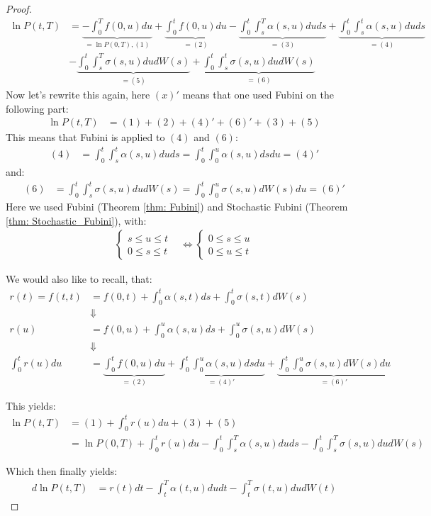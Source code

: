 \begin{proof}
\begin{align*}
\ln P(t,T) &=  
\underbrace{-\int_{0}^{T}f(0,u)du}_{= \ln P(0,T), (1)} 
+\underbrace{\int_{0}^{t}f(0,u)du}_{= (2)} 
- \underbrace{\int_{0}^{t}\int_{s}^{T}\alpha(s,u)duds}_{= (3)}
+ \underbrace{\int_{0}^{t}\int_{s}^{t}\alpha(s,u)duds}_{= (4)} \\ 
&- \underbrace{\int_{0}^{t}\int_{s}^{T}\sigma(s,u)dudW(s)}_{= (5)} 
+ \underbrace{\int_{0}^{t}\int_{s}^{t}\sigma(s,u)dudW(s)}_{= (6)}
\end{align*}
Now let's rewrite this again, here $(x)'$ means that one used Fubini on the following part: 
\begin{align*}
\ln P(t,T) &= (1) + (2) +(4)' + (6)' + (3) + (5)
\end{align*}
This means that Fubini is applied to $(4)$ and $(6)$: 
\begin{align*}
(4) &= \int_{0}^{t}\int_{s}^{t}\alpha(s,u)duds 
= \int_{0}^{t}\int_{0}^{u}\alpha(s,u)dsdu = (4)'
\end{align*}
and: 
\begin{align*}
(6) &= \int_{0}^{t}\int_{s}^{t}\sigma(s,u)dudW(s) = 
\int_{0}^{t}\int_{0}^{u}\sigma(s,u)dW(s)du = (6)'
\end{align*}
Here we used Fubini (Theorem \ref{thm: Fubini}) and Stochastic Fubini (Theorem \ref{thm: Stochastic_Fubini}), with:
\begin{align*}
\begin{cases}
 s \leq u \leq t \\ 
 0 \leq s \leq t
\end{cases}
&\iff
\begin{cases}
 0 \leq s \leq u \\ 
 0 \leq u \leq t
\end{cases}
\end{align*}

\newpage 
We would also like to recall, that: 
\begin{align*}
r(t) = f(t,t) 
&= f(0,t) + \int_{0}^{t}\alpha(s,t)ds + \int_{0}^{t}\sigma(s,t)dW(s) \\ 
&\Downarrow \\ 
r(u) &= f(0,u) + \int_{0}^{u}\alpha(s,u)ds + \int_{0}^{u}\sigma(s,u)dW(s) \\ 
&\Downarrow \\ 
\int_{0}^{t}r(u)du &= 
\underbrace{\int_{0}^{t}f(0,u)du}_{=(2)} 
+ \underbrace{\int_{0}^{t}\int_{0}^{u}\alpha(s,u)dsdu}_{= (4)'} 
+ \underbrace{\int_{0}^{t}\int_{0}^{u}\sigma(s,u)dW(s)du}_{= (6)'}
\end{align*}

This yields: 
\begin{align*}
\ln P(t,T) &= 
(1) + \int_{0}^{t}r(u)du + (3) + (5) \\ 
&= 
\ln P(0,T) + \int_{0}^{t}r(u)du 
-\int_{0}^{t}\int_{s}^{T}\alpha(s,u)duds 
-\int_{0}^{t}\int_{s}^{T}\sigma(s,u)dudW(s)
\end{align*}

Which then finally yields: 
\begin{align*}
d\ln P(t,T) &= 
r(t)dt - \int_{t}^{T}\alpha(t,u)dudt - \int_{t}^{T}\sigma(t,u)dudW(t)
\end{align*}     
\end{proof}

